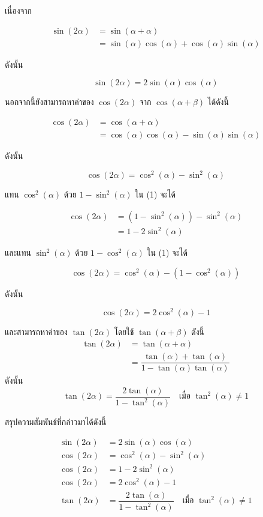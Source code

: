 เนื่องจาก

\[
\begin{aligned}
	\sin(2\alpha)
	&=
	\sin(\alpha+\alpha)
	\\
	&=
	\sin(\alpha)\cos(\alpha)
	+
	\cos(\alpha)\sin(\alpha)
\end{aligned}
\]

ดังนั้น

\[
\sin(2\alpha)
=
2\sin(\alpha)\cos(\alpha)
\]


\noindent นอกจากนี้ยังสามารถหาค่าของ $\cos(2\alpha)$ จาก $\cos(\alpha+\beta)$ ได้ดังนี้

\[
\begin{aligned}
	\cos(2\alpha)
	&=
	\cos(\alpha+\alpha)
	\\
	&=
	\cos(\alpha)\cos(\alpha)
	-
	\sin(\alpha)\sin(\alpha)
\end{aligned}
\]

ดังนั้น

\begin{equation*}
	\cos(2\alpha)
	=
	\cos^{2}(\alpha)-\sin^{2}(\alpha)
	\tag{1}
\end{equation*}

แทน $\cos^{2}(\alpha)$ ด้วย $1-\sin^{2}(\alpha)$ ใน (1) จะได้

\[
\begin{aligned}
	\cos(2\alpha)
	&=
	\left(1-\sin^{2}(\alpha)\right)-\sin^{2}(\alpha)
	\\
	&=
	1-2\sin^{2}(\alpha)
\end{aligned}
\]

และแทน $\sin^{2}(\alpha)$ ด้วย $1-\cos^{2}(\alpha)$ ใน (1) จะได้

\[
\cos(2\alpha)
=
\cos^{2}(\alpha)-\left(1-\cos^{2}(\alpha)\right)
\]

ดังนั้น

\[
\cos(2\alpha)
=
2\cos^{2}(\alpha)-1
\]


และสามารถหาค่าของ $\tan(2\alpha)$ โดยใช้ $\tan(\alpha+\beta)$ ดังนี้
$$
\begin{aligned}
	\tan(2\alpha) & = \tan(\alpha+\alpha) \\
	& = \dfrac{\tan(\alpha) + \tan(\alpha)}{1 - \tan(\alpha) \tan(\alpha)}
\end{aligned}
$$
ดังนั้น
$$
\tan(2\alpha) = \dfrac{2 \tan(\alpha)}{1 - \tan^{2}(\alpha)} \quad \text{เมื่อ } \tan^{2}(\alpha) \neq 1
$$

สรุปความสัมพันธ์ที่กล่าวมาได้ดังนี้
\begin{remarkbox}
	\[
	\begin{aligned}
		\sin(2\alpha) & = 2 \sin(\alpha) \cos(\alpha) \\
		\cos(2\alpha) & = \cos^{2}(\alpha) - \sin^{2}(\alpha) \\
		\cos(2\alpha) & = 1 - 2 \sin^{2}(\alpha) \\
		\cos(2\alpha) & = 2 \cos^{2}(\alpha) - 1 \\
		\tan(2\alpha) & = \dfrac{2 \tan(\alpha)}{1 - \tan^{2}(\alpha)} \quad \text{เมื่อ } \tan^{2}(\alpha) \neq 1
	\end{aligned}
	\]
\end{remarkbox}


